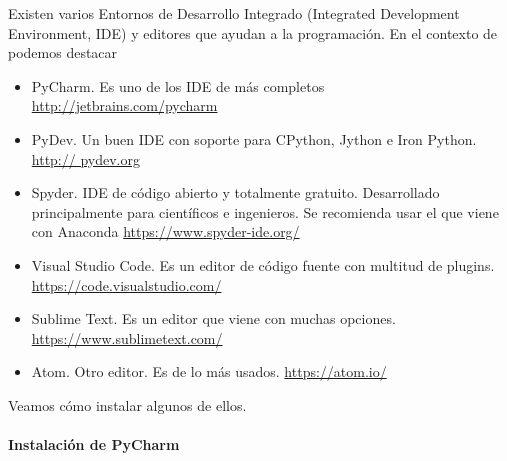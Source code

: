 Existen varios Entornos de Desarrollo Integrado (Integrated Development Environment, IDE) y editores que ayudan a la programación. En el contexto de  podemos destacar
\begin{itemize}
\item PyCharm. Es uno de los IDE de  más completos \url{http://jetbrains.com/pycharm}

\item PyDev. Un buen IDE con soporte para CPython, Jython e Iron Python. \url{http:// pydev.org}

\item Spyder. IDE de código abierto y totalmente gratuito. Desarrollado principalmente para científicos e ingenieros. Se recomienda usar el que viene con Anaconda \url{https://www.spyder-ide.org/}

\item Visual Studio Code. Es un editor de código fuente con multitud de plugins. \url{https://code.visualstudio.com/} 

\item Sublime Text. Es un editor que viene con muchas opciones. \url{https://www.sublimetext.com/}

\item Atom. Otro editor. Es de lo más usados. \url{https://atom.io/}
\end{itemize}


Veamos cómo instalar algunos de ellos.


\paragraph{Instalación de PyCharm}

